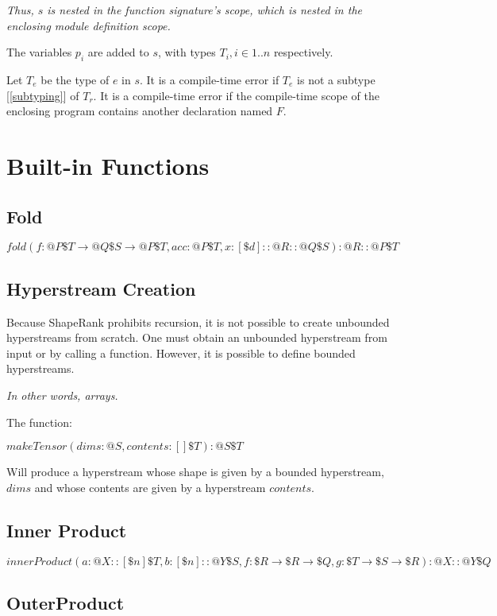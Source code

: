 \documentclass{article}
\begin{document}
{\em Thus, $s$ is nested in the function signature's scope, which is nested in the enclosing module definition scope.}

The variables $p_i$ are added to $s$, with types $T_i, i \in 1..n$ respectively.

Let $T_e$ be the type of $e$ in $s$. 
It is a compile-time error if  $T_e$ is not a subtype [\ref{subtyping}] of $T_r$.  It is a compile-time error if the compile-time scope of the enclosing program contains another declaration named $F$.

\section{Built-in Functions}
\label{builtinFunctions}


\subsection{Fold}
\label{fold}


$fold(f: @P\$T \to{}@Q\$S \to{}@P\$T, acc: @P\$T, x:[\$d]::@R::@Q \$S): @R::@P \$T $

\subsection{Hyperstream Creation}
\label{streamCreation}

Because ShapeRank prohibits recursion, it is not possible to create unbounded hyperstreams from scratch. One must obtain an unbounded hyperstream from input or by calling a function.
However, it is possible to define bounded hyperstreams.

{\em In other words, arrays.}

The function:

$makeTensor(dims: @S, contents: []\$T):@S \$T$

Will produce a hyperstream whose shape is given by a bounded hyperstream, $dims$ and whose contents are given by a hyperstream $contents$.

\subsection{Inner Product}
\label{innerProduct}

$innerProduct(a: @X:: [\$n]\$T, b: [\$n]::@Y\$S,  f: \$R \to \$R \to \$Q, g: \$T \to \$S \to \$R): @X::@Y\$Q$

\subsection{OuterProduct}
\label{outerProdcut}
\end{document}
